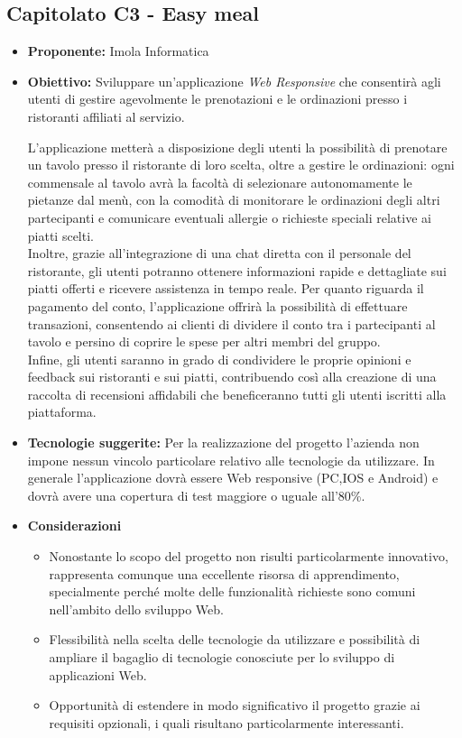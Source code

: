 \documentclass{article}
\begin{document}
\subsection{\textbf{Capitolato C3} - Easy meal}
\begin{itemize}
    \item[] \textbf{Proponente:} Imola Informatica
    
    \item[] \textbf{Obiettivo:} Sviluppare un’applicazione \textit{Web Responsive} che consentirà agli utenti di gestire agevolmente le prenotazioni e le ordinazioni presso i ristoranti affiliati al servizio.
    
    L'applicazione metterà a disposizione degli utenti la possibilità di prenotare un tavolo presso il ristorante di loro scelta, oltre a gestire le ordinazioni: ogni commensale al tavolo avrà la facoltà di selezionare autonomamente le pietanze dal menù, con la comodità di monitorare le ordinazioni degli altri partecipanti e comunicare eventuali allergie o richieste speciali relative ai piatti scelti. \\
    Inoltre, grazie all'integrazione di una chat diretta con il personale del ristorante, gli utenti potranno ottenere informazioni rapide e dettagliate sui piatti offerti e ricevere assistenza in tempo reale.
    Per quanto riguarda il pagamento del conto, l'applicazione offrirà la possibilità di effettuare transazioni, consentendo ai clienti di dividere il conto tra i partecipanti al tavolo e persino di coprire le spese per altri membri del gruppo. \\
    Infine, gli utenti saranno in grado di condividere le proprie opinioni e feedback sui ristoranti e sui piatti, contribuendo così alla creazione di una raccolta di recensioni affidabili che beneficeranno tutti gli utenti iscritti alla piattaforma.
    
    \item[] \textbf{Tecnologie suggerite:} Per la realizzazione del progetto l’azienda non impone nessun vincolo particolare relativo alle tecnologie da utilizzare. In generale l’applicazione dovrà essere Web responsive (PC,IOS e Android) e dovrà avere una copertura di test maggiore o uguale all’80\%.

    \item[] \textbf{Considerazioni}
    \begin{itemize}
        \item Nonostante lo scopo del progetto non risulti particolarmente innovativo, rappresenta comunque una eccellente risorsa di apprendimento, specialmente perché molte delle funzionalità richieste sono comuni nell’ambito dello sviluppo Web.
        \item Flessibilità nella scelta delle tecnologie da utilizzare e possibilità di ampliare il bagaglio di tecnologie conosciute per lo sviluppo di applicazioni Web.
        \item Opportunità di estendere in modo significativo il progetto grazie ai requisiti opzionali, i quali risultano particolarmente interessanti.
    \end{itemize} 
    
\end{itemize}
\pagebreak
\end{document}
